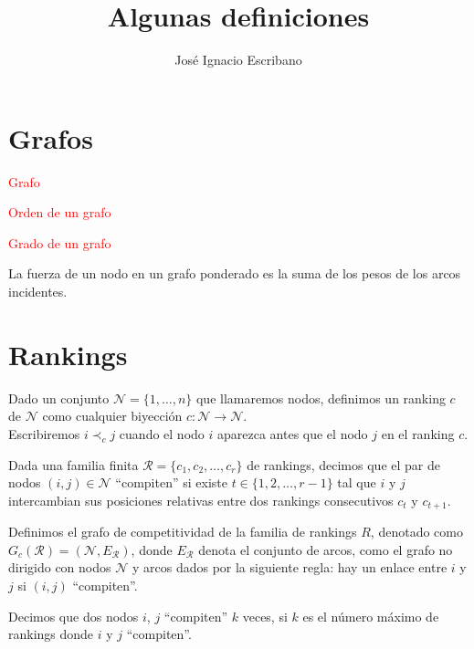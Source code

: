 \documentclass[10pt,a4paper]{article}
\author{José Ignacio Escribano}
\title{Algunas definiciones}
\begin{document}
\section{Grafos}

\begin{defi}
\textcolor{red}{Grafo}
\end{defi}

\begin{defi}
\textcolor{red}{Orden de un grafo}
\end{defi}

\begin{defi}
\textcolor{red}{Grado de un grafo}
\end{defi}

\begin{defi}
La fuerza de un nodo en un grafo ponderado es la suma de los pesos de los arcos incidentes.
\end{defi}

\section{Rankings}

\begin{defi}
Dado un conjunto $\mathcal{N} = \{1,\dots,n\}$ que llamaremos nodos, definimos un ranking $c$ de $\mathcal{N}$ como cualquier biyección $c: \mathcal{N} \to \mathcal{N}$.\\
Escribiremos $i \prec_c j$ cuando el nodo $i$ aparezca antes que el nodo $j$ en el ranking $c$. 
\end{defi}

\begin{defi}
Dada una familia finita $\mathcal{R} = \{c_1,c_2,\dots, c_r\}$ de rankings, decimos que el par de nodos $(i,j) \in \mathcal{N}$ ``compiten'' si existe $t \in \{1,2,\dots, r-1\}$ tal que $i$ y $j$ intercambian sus posiciones relativas entre dos rankings consecutivos $c_t$ y $c_{t+1}$.
\end{defi}

\begin{defi}
Definimos el grafo de competitividad de la familia de rankings $R$, denotado como $G_c(\mathcal{R}) = (\mathcal{N}, E_\mathcal{R})$, donde $E_\mathcal{R}$ denota el conjunto de arcos, como el grafo no dirigido con nodos $\mathcal{N}$ y arcos dados por la siguiente regla: hay un enlace entre $i$ y $j$ si $(i,j)$ ``compiten''.
\end{defi}

\begin{defi}
Decimos que dos nodos $i$, $j$ ``compiten'' $k$ veces, si $k$ es el número máximo de rankings donde $i$ y $j$ ``compiten''.
\end{defi}
\end{document}
